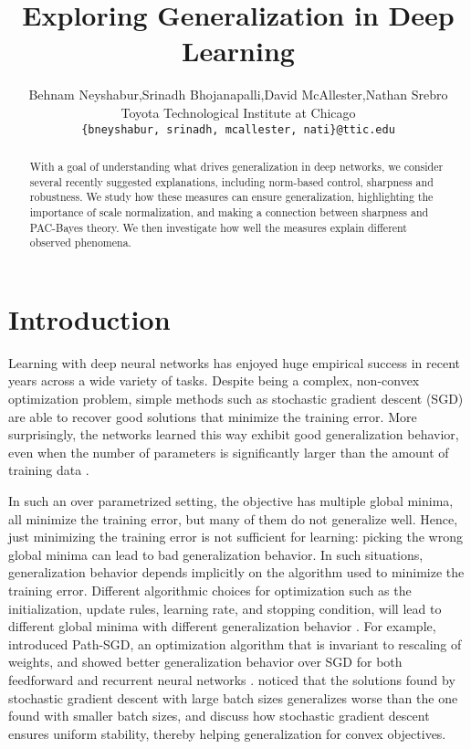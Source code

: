 \documentclass{article}
\title{Exploring Generalization in Deep Learning}
\author{
  Behnam Neyshabur,\;Srinadh Bhojanapalli,\;David McAllester,\;Nathan Srebro\\
  Toyota Technological Institute at Chicago\\
  \texttt{\{bneyshabur, srinadh, mcallester, nati\}@ttic.edu} \\
}
\begin{document}
\maketitle

\begin{abstract}
With a goal of understanding what drives generalization in deep networks, we consider several recently suggested explanations, including norm-based control, sharpness and robustness. We study how these measures can ensure generalization, highlighting the importance of scale normalization, and making a connection between sharpness and PAC-Bayes theory.  We then investigate how well the measures explain different observed phenomena.
\end{abstract}

\section{Introduction}
Learning with deep neural networks has enjoyed huge empirical success in recent years across a wide variety of tasks. Despite being a complex, non-convex optimization problem, simple methods such as stochastic gradient descent (SGD) are able to recover good solutions that minimize the training error. More surprisingly, the networks learned this way exhibit good generalization behavior, even when the number of parameters is significantly larger than the amount of training data \cite{neyshabur15b,zhang2017understanding}.

In such an over parametrized setting, the objective has multiple global minima, all minimize the training error, but many of them do not generalize well.  %
Hence, just minimizing the training error is not sufficient for learning: picking the wrong global minima can lead to bad generalization behavior. In such situations, generalization behavior depends implicitly on the algorithm used to minimize the training error. Different algorithmic choices for optimization such as the initialization, update rules, learning rate, and stopping condition, will lead to different global minima with different generalization behavior \cite{chaudhari2016entropy, keskar2016large, NeySalSre15}. For example, \citet{NeySalSre15} introduced Path-SGD, an optimization algorithm that is invariant to rescaling of weights, and showed better generalization behavior over SGD for both feedforward and recurrent neural networks \cite{NeySalSre15,neyshabur2016path}. \citet{keskar2016large} noticed that the solutions found by stochastic gradient descent with large batch sizes generalizes worse than the one found with smaller batch sizes, and \citet{hardt2015train} discuss how stochastic gradient descent ensures uniform stability, thereby helping generalization for convex objectives.
\end{document}
